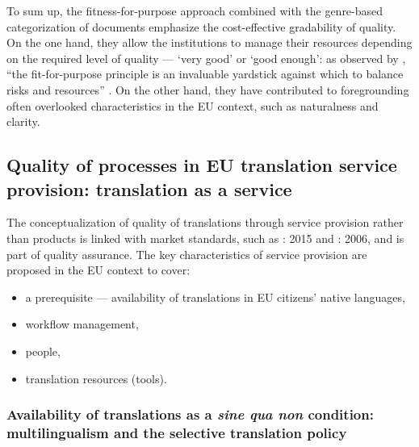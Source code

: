 \documentclass[output=paper]{langsci/langscibook}
\begin{document}
To sum up, the fitness-for-purpose approach combined with the genre-based categorization of documents emphasize the cost-effective gradability of quality. On the one hand, they allow the institutions to manage their resources depending on the required level of quality — ‘very good’ or ‘good enough’: as observed by \citeauthor{Martin2007}, “the fit-for-purpose principle is an invaluable yardstick against which to balance risks and resources” \citeyear[60]{Martin2007}. On the other hand, they have contributed to foregrounding often overlooked characteristics in the EU context, such as naturalness and clarity.

\subsection{Quality of processes in EU translation service provision: translation as a service}\label{sec:biel:3.2}

The conceptualization of quality of translations through service provision rather than products is linked with market standards, such as \citeauthor{ISO2015}: 2015 and \citeauthor{EN2006}: 2006, and is part of quality assurance. The key characteristics of service provision are proposed in the EU context to cover:

\begin{itemize}
\item 
a prerequisite — availability of translations in EU citizens’ native languages,
\item 
workflow management,
\item 
people, 
\item 
translation resources (tools).
\end{itemize}

\subsubsection{Availability of translations as a \textit{sine qua non} condition: multilingualism and the selective translation policy}\label{sec:biel:3.2.1}
\end{document}
